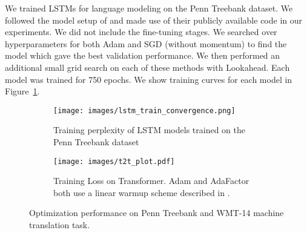 \documentclass{article}
\begin{document}
We trained LSTMs \citep{hochreiter1997long} for language modeling on the Penn Treebank dataset. We followed the model setup of \citet{merity2017regularizing} and made use of their publicly available code in our experiments. We did not include the fine-tuning stages. We searched over hyperparameters for both Adam and SGD (without momentum) to find the model which gave the best validation performance. We then performed an additional small grid search on each of these methods with Lookahead. Each model was trained for 750 epochs. We show training curves for each model in Figure~\ref{fig:lstm-train}.

\begin{figure}[t]
\begin{subfigure}{0.45 \textwidth}
\centering
    \vskip -0.1in
    \texttt{[image: images/lstm\_train\_convergence.png]}
    \caption{Training perplexity of LSTM models trained on the Penn Treebank dataset}
    \label{fig:lstm-train}
\end{subfigure}
\hfill
\hspace{0.05in}
\begin{subfigure}{0.45 \textwidth}
    \centering
    \texttt{[image: images/t2t\_plot.pdf]}
    \caption{Training Loss on Transformer. Adam and AdaFactor both use a linear warmup scheme described in \citet{vaswani2017attention}.}
    \label{fig:nmt}
\end{subfigure}
\caption{Optimization performance on Penn Treebank and WMT-14 machine translation task.}
\end{figure}
\end{document}
